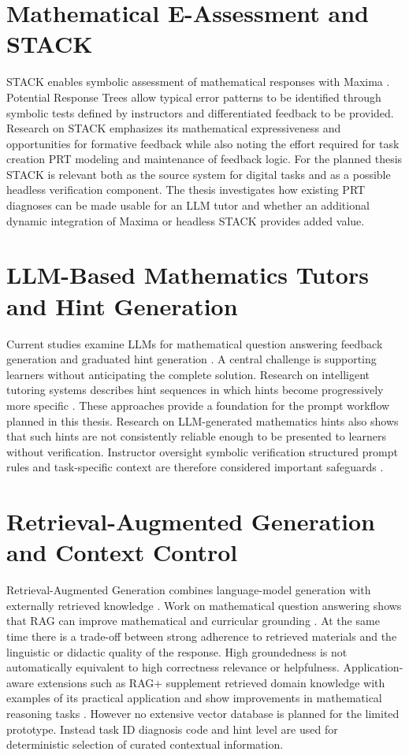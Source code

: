\documentclass[11pt,a4paper,oneside,ngerman]{memoir}
\begin{document}
\section{Mathematical E-Assessment and STACK}
STACK enables symbolic assessment of mathematical responses with Maxima \autocite{sangwin2013computer,stackdocumentation}. Potential Response Trees allow typical error patterns to be identified through symbolic tests defined by instructors and differentiated feedback to be provided. Research on STACK emphasizes its mathematical expressiveness and opportunities for formative feedback while also noting the effort required for task creation PRT modeling and maintenance of feedback logic.
For the planned thesis STACK is relevant both as the source system for digital tasks and as a possible headless verification component. The thesis investigates how existing PRT diagnoses can be made usable for an LLM tutor and whether an additional dynamic integration of Maxima or headless STACK provides added value.
\section{LLM-Based Mathematics Tutors and Hint Generation}
Current studies examine LLMs for mathematical question answering feedback generation and graduated hint generation \autocite{aleven2023future,levonian2023ragmath}. A central challenge is supporting learners without anticipating the complete solution. Research on intelligent tutoring systems describes hint sequences in which hints become progressively more specific \autocite{vanlehn2006behavior,stamper2010hints}. These approaches provide a foundation for the prompt workflow planned in this thesis.
Research on LLM-generated mathematics hints also shows that such hints are not consistently reliable enough to be presented to learners without verification. Instructor oversight symbolic verification structured prompt rules and task-specific context are therefore considered important safeguards \autocite{kasneci2023chatgpt,nye2023generative}.
\section{Retrieval-Augmented Generation and Context Control}
Retrieval-Augmented Generation combines language-model generation with externally retrieved knowledge \autocite{lewis2020rag}. Work on mathematical question answering shows that RAG can improve mathematical and curricular grounding \autocite{levonian2023ragmath}. At the same time there is a trade-off between strong adherence to retrieved materials and the linguistic or didactic quality of the response. High groundedness is not automatically equivalent to high correctness relevance or helpfulness.
Application-aware extensions such as RAG+ supplement retrieved domain knowledge with examples of its practical application and show improvements in mathematical reasoning tasks \autocite{wang2025ragplus}. However no extensive vector database is planned for the limited prototype. Instead task ID diagnosis code and hint level are used for deterministic selection of curated contextual information.
\end{document}
